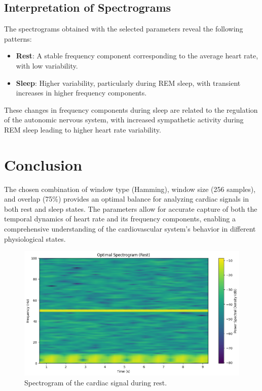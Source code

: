 \documentclass[10pt]{article}
\theoremstyle{definition}
\theoremstyle{remark}
\theoremstyle{definition}
\numberwithin{equation}{prob}
\begin{document}
\subsection{Interpretation of Spectrograms}

The spectrograms obtained with the selected parameters reveal the following patterns:
\begin{itemize}
    \item \textbf{Rest}: A stable frequency component corresponding to the average heart rate, with low variability.
    \item \textbf{Sleep}: Higher variability, particularly during REM sleep, with transient increases in higher frequency components.
\end{itemize}

These changes in frequency components during sleep are related to the regulation of the autonomic nervous system, with increased sympathetic activity during REM sleep leading to higher heart rate variability.

\section*{Conclusion}

The chosen combination of window type (Hamming), window size (256 samples), and overlap (75\%) provides an optimal balance for analyzing cardiac signals in both rest and sleep states. The parameters allow for accurate capture of both the temporal dynamics of heart rate and its frequency components, enabling a comprehensive understanding of the cardiovascular system's behavior in different physiological states.

\begin{figure}[h]
    \centering
    \includegraphics[width=0.8\linewidth]{./figures/Optimal Spectrogram (Rest).png}
    \caption{Spectrogram of the cardiac signal during rest.}
\end{figure}
\end{document}
